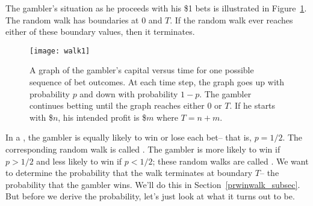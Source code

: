 The gambler's situation as he proceeds with his \$1 bets is illustrated in
Figure~\ref{LN12:fig:walk1}.  The random walk has boundaries at 0 and $T$.  If
the random walk ever reaches either of these boundary values, then it
terminates.

\begin{figure}
  \centerline{\texttt{[image: walk1]}}
  \caption{A graph of the gambler's capital versus time for one
    possible sequence of bet outcomes.  At each time step, the graph
    goes up with probability $p$ and down with probability $1-p$.  The
    gambler continues betting until the graph reaches either 0 or $T$.
    If he starts with \$$n$, his intended profit is \$$m$ where
    $T=n+m$.}
  \label{LN12:fig:walk1}
\end{figure}

In a , the gambler is equally likely to win or lose
each bet-- that is, $p = 1/2$.  The corresponding random walk is
called .  The gambler is more likely to win if $p>1/2$
and less likely to win if $p<1/2$; these random walks are called
.  We want to determine the probability that the walk
terminates at boundary $T$-- the probability that the gambler wins.
We'll do this in Section~\ref{prwinwalk_subsec}. But before we derive
the probability, let's just look at what it turns out to be.

